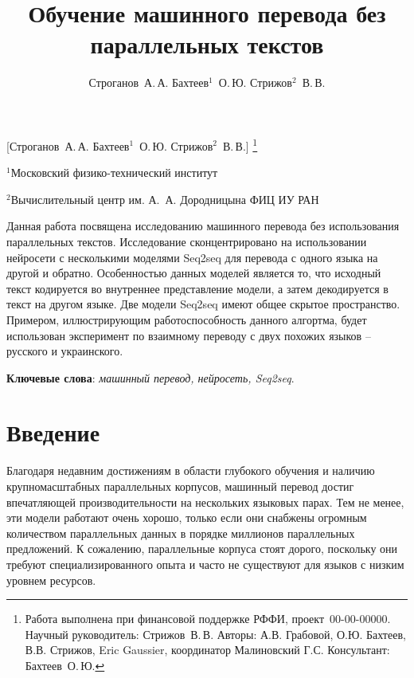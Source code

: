 \documentclass[12pt,twoside]{article}
\begin{document}
\title
    [Обучение машинного перевода без параллельных текстов] %
    {Обучение машинного перевода без параллельных текстов}
\author
    [Строганов~А.\,А. Бахтеев$^1$~О.\,Ю.  Стрижов$^2$~В.\,В.] %
    {Строганов~А.\,А. Бахтеев$^1$~О.\,Ю.  Стрижов$^2$~В.\,В.} %
    [Строганов~А.\,А. Бахтеев$^1$~О.\,Ю.  Стрижов$^2$~В.\,В.] %
\thanks
    {Работа выполнена при финансовой поддержке РФФИ, проект \No\,00-00-00000.
   Научный руководитель:  Стрижов~В.\,В.
   Авторы: А.В. Грабовой, О.Ю. Бахтеев, В.В. Стрижов, Eric Gaussier, координатор Малиновский Г.С.
    Консультант:  Бахтеев~О.\,Ю.}
\organization
     {$^1$Московский физико-технический институт\par
      $^2$Вычислительный центр им. А.~А. Дородницына ФИЦ ИУ РАН}

\abstract
    {Данная работа посвящена исследованию машинного перевода без использования параллельных текстов. Исследование сконцентрировано на использовании нейросети с несколькими моделями Seq2seq для перевода с одного языка на другой и обратно. Особенностью данных моделей является то, что исходный текст кодируется во внутреннее представление модели, а затем декодируется в текст на другом языке. Две модели Seq2seq имеют общее скрытое пространство. Примером, иллюстрирующим работоспособность данного алгортма, будет использован эксперимент по взаимному переводу с двух похожих языков -- русского и украинского.
    
    \bigskip
    \textbf{Ключевые слова}: \emph {машинный перевод, нейросеть, Seq2seq}.}
\maketitle
\section{Введение}
Благодаря недавним достижениям в области глубокого обучения и наличию крупномасштабных параллельных корпусов, машинный перевод достиг впечатляющей производительности на нескольких языковых парах. Тем не менее, эти модели работают очень хорошо, только если они снабжены огромным количеством параллельных данных в порядке миллионов параллельных предложений.
К сожалению, параллельные корпуса стоят дорого\cite{koehn2009statistical}, поскольку они требуют специализированного опыта и часто не существуют для языков с низким уровнем ресурсов. 
\end{document}
